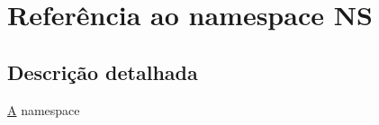 \hypertarget{namespace_n_s}{\section{Referência ao namespace N\-S}
\label{namespace_n_s}
}


\subsection{Descrição detalhada}
\hyperlink{class_a}{A} namespace 